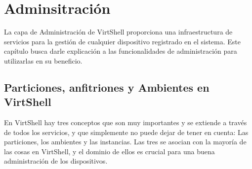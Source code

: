 \chapter{Adminsitración}
\label{capadministracion}

La capa de Administración de VirtShell proporciona una infraestructura de servicios para la gestión de cualquier dispositivo registrado en el sistema. Este capítulo busca darle explicación a las funcionalidades de administración para utilizarlas en su beneficio.

\section{Particiones, anfitriones y Ambientes en VirtShell}
En VirtShell hay tres conceptos que son muy importantes y se extiende a través de todos los servicios, y que simplemente no puede dejar de tener en cuenta: Las particiones, los ambientes y las instancias. Las tres se asocian con la mayoría de las cosas en VirtShell, y el dominio de ellos es crucial para una buena administración de los dispositivos. 

